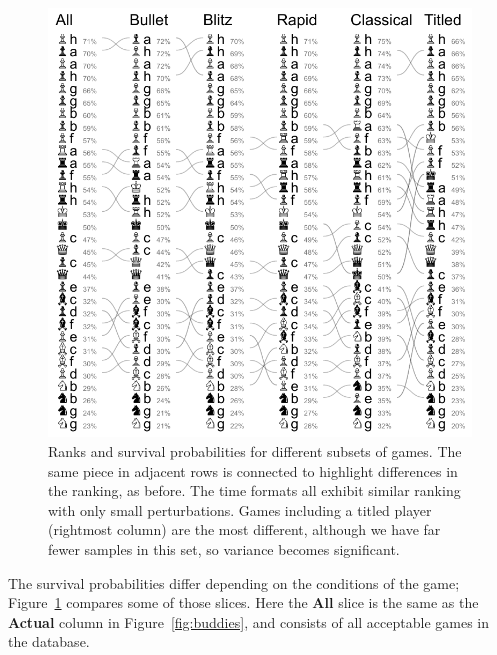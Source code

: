 \documentclass[twocolumn]{article}
\begin{document}
\begin{figure}[t]
  \includegraphics[width=\linewidth]{slices}
  \caption{
    Ranks and survival probabilities for different subsets of games.
    The same piece in adjacent rows is connected to highlight
    differences in the ranking, as before. The time formats all
    exhibit similar ranking with only small perturbations. Games
    including a titled player (rightmost column) are the most
    different, although we have far fewer samples in this set,
    so variance becomes significant.
  } \label{fig:slices}
\end{figure}

The survival probabilities differ depending on the conditions of the
game; Figure~\ref{fig:slices} compares some of those slices. Here the
{\bf All} slice is the same as the {\bf Actual} column in
Figure~\ref{fig:buddies}, and consists of all acceptable games in the
database.
\end{document}
